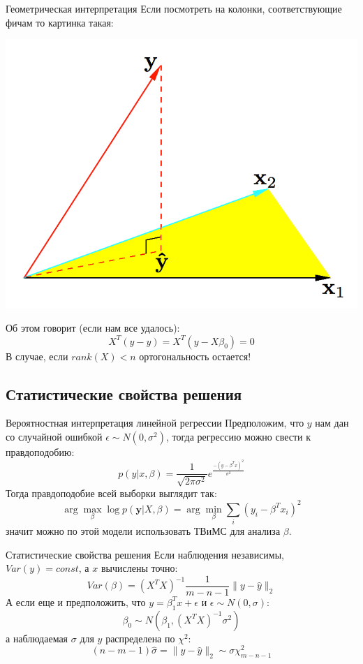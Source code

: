 \documentclass[14pt, fleqn, xcolor={dvipsnames, table}]{beamer}
\begin{document}
\begin{frame}{Геометрическая интерпретация}
\small
Если посмотреть на колонки, соответствующие фичам то картинка такая:
\begin{center}
\includegraphics[height=0.4\textheight]{3_2.png}
\end{center}
Об этом говорит (если нам все удалось):
$$
X^T(y - \hat{y}) = X^T(y - X\beta_0) = 0
$$
В случае, если $rank(X) < n$ ортогональность остается!
\end{frame}

\subsection{Статистические свойства решения}

\begin{frame}{Вероятностная интерпретация линейной регрессии}
Предположим, что $y$ нам дан со случайной ошибкой $\epsilon \sim N(0, \sigma^2)$, тогда регрессию можно свести к правдоподобию:
$$
p(y|x, \beta) = \frac{1}{\sqrt{2\pi\sigma^2}} e^{\frac{-(y - \beta^T x)^2}{\sigma^2}}
$$
Тогда правдоподобие всей выборки выглядит так:
$$
\arg \max_\beta \log p(\mathbf{y}|X, \beta) = \arg \min_\beta \sum_i \left(y_i - \beta^Tx_i\right)^2
$$
значит можно по этой модели использовать ТВиМС для анализа $\beta$.
\end{frame}

\begin{frame}{Статистические свойства решения}
Если наблюдения независимы, $Var(y) = const$, а $x$ вычислены точно:
$$
Var(\beta) = \left(X^TX\right)^{-1}\frac{1}{m - n - 1}\|y - \hat{y}\|_2
$$
А если еще и предположить, что $y=\beta_1^Tx + \epsilon$ и $\epsilon \sim N(0,\sigma)$:
$$
\beta_0 \sim N(\beta_1, \left(X^TX\right)^{-1}\sigma^2)
$$
а наблюдаемая $\sigma$ для $y$ распределена по $\chi^2$:
$$
(n-m-1)\hat{\sigma} = \|y - \hat{y}\|_2 \sim \sigma \chi^2_{m-n-1}
$$
\end{frame}
\end{document}
